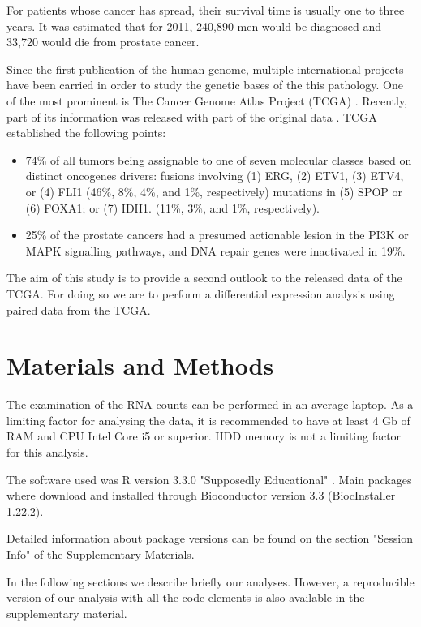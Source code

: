 \documentclass[9pt,twocolumn,twoside]{gsajnl}
\begin{document}
For patients whose cancer has spread, their survival time is usually one to three years. It was estimated that for 2011, 240,890 men would be diagnosed and 33,720 would die from prostate cancer.


Since the first publication of the human genome, multiple international projects have been carried in order to study the genetic bases of the this pathology. One of the most prominent is The Cancer Genome Atlas Project (TCGA) \cite{tgca}. Recently, part of its information was released with part of the original data \cite{Rahman15112015}. TCGA established the following points:

\begin{itemize}
\item 74\% of all tumors being assignable to one of seven molecular classes based on distinct oncogenes drivers:
        fusions involving (1) ERG, (2) ETV1, (3) ETV4, or (4) FLI1 (46\%, 8\%, 4\%, and 1\%, respectively)
        mutations in (5) SPOP or (6) FOXA1; or (7) IDH1. (11\%, 3\%, and 1\%, respectively).
\item 25\% of the prostate cancers had a presumed actionable lesion in the PI3K or MAPK signalling pathways, and DNA repair genes were inactivated in 19\%.
\end{itemize}


The aim of this study is to provide a second outlook to the released data of the TCGA. For doing so we are to perform a differential expression analysis using paired data from the TCGA.

\section*{Materials and Methods}
The examination of the RNA counts can be performed in an average laptop. As a limiting factor for analysing the data, it is recommended to have at least 4 Gb of RAM and CPU Intel Core i5 or superior. HDD memory is not a limiting factor for this analysis.

The software used was R version 3.3.0 "Supposedly Educational" \cite{R}. Main packages where download and installed through Bioconductor version 3.3 (BiocInstaller 1.22.2)\cite{bioconductor}.

Detailed information about package versions can be found on the section "Session Info" of the Supplementary Materials.

In the following sections we describe briefly our analyses. However, a reproducible version of our analysis with all the code elements is also available in the supplementary material.
\end{document}
